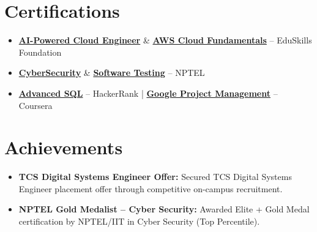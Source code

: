 \documentclass[10pt, letterpaper]{article}
\begin{document}
\section{Certifications}
\begin{itemize}
    \item \textbf{\href{https://certificate.eduskillsfoundation.org/verify/4d6c9ddc4847b75c885f/4d6c9ddc4847b75c885f}{AI-Powered Cloud Engineer}} \& \textbf{\href{https://aictecert.eduskillsfoundation.org/pages/home/verify.php?cert=506c51bebf5346e89556de98be1e44ce}{AWS Cloud Fundamentals}} -- EduSkills Foundation
    \item \textbf{\href{https://nptel.ac.in/noc/E_Certificate/NPTEL25CS120S65310101810650629}{CyberSecurity}} \& \textbf{\href{https://nptel.ac.in/noc/E_Certificate/NPTEL25CS113S25310089010650629}{Software Testing}} -- NPTEL
    \item \textbf{\href{https://www.hackerrank.com/certificates/e0bfd3d447c0}{Advanced SQL}} -- HackerRank | \textbf{\href{https://coursera.org/verify/6D9HTS2HRFHG}{Google Project Management}} -- Coursera
\end{itemize}

\section{Achievements}
\begin{itemize}
    \item \textbf{TCS Digital Systems Engineer Offer:} Secured TCS Digital Systems Engineer placement offer through competitive on-campus recruitment.
    \item \textbf{NPTEL Gold Medalist -- Cyber Security:} Awarded Elite + Gold Medal certification by NPTEL/IIT in Cyber Security (Top Percentile).
\end{itemize}
\end{document}

